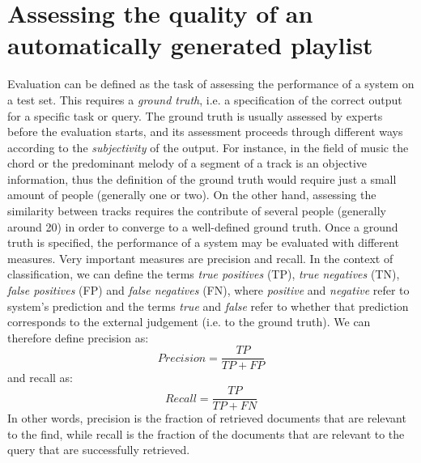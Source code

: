\chapter{Assessing the quality of an automatically generated playlist} 

\label{Chapter3} 

Evaluation can be defined as the task of assessing the performance of a system on a test set. This requires a \textit{ground truth}, i.e. a specification of the correct output for a specific task or query. The ground truth is usually assessed by experts before the evaluation starts, and its assessment proceeds through different ways according to the \textit{subjectivity} of the output. For instance, in the field of music the chord or the predominant melody of a segment of a track is an objective information, thus the definition of the ground truth would require just a small amount of people (generally one or two). On the other hand, assessing the similarity between tracks requires the contribute of several people (generally around 20) in order to converge to a well-defined ground truth. Once a ground truth is specified, the performance of a system may be evaluated with different measures. Very important measures are precision and recall. In the context of classification, we can define the terms \textit{true positives} (TP), \textit{true negatives} (TN), \textit{false positives} (FP) and \textit{false negatives} (FN), where \textit{positive} and \textit{negative} refer to system's prediction and the terms \textit{true} and \textit{false} refer to whether that prediction corresponds to the external judgement (i.e. to the ground truth). We can therefore define precision as:
\begin{equation}
Precision = \frac{TP}{TP+FP}
\end{equation}
and recall as:
\begin{equation}
Recall = \frac{TP}{TP+FN}
\end{equation}
In other words, precision is the fraction of retrieved documents that are relevant to the find, while recall is the fraction of the documents that are relevant to the query that are successfully retrieved.

